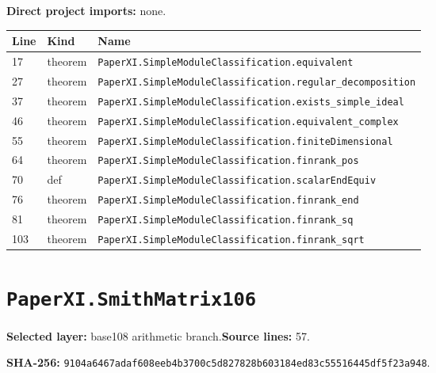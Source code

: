 \documentclass[10pt,oneside]{book}
\begin{document}
\textbf{Direct project imports:} none.

\begin{longtable}{@{}p{}p{}p{}@{}}\toprule Line&Kind&Name\\\midrule\endhead

17&theorem&\nolinkurl{PaperXI.SimpleModuleClassification.equivalent}\\

27&theorem&\nolinkurl{PaperXI.SimpleModuleClassification.regular_decomposition}\\

37&theorem&\nolinkurl{PaperXI.SimpleModuleClassification.exists_simple_ideal}\\

46&theorem&\nolinkurl{PaperXI.SimpleModuleClassification.equivalent_complex}\\

55&theorem&\nolinkurl{PaperXI.SimpleModuleClassification.finiteDimensional}\\

64&theorem&\nolinkurl{PaperXI.SimpleModuleClassification.finrank_pos}\\

70&def&\nolinkurl{PaperXI.SimpleModuleClassification.scalarEndEquiv}\\

76&theorem&\nolinkurl{PaperXI.SimpleModuleClassification.finrank_end}\\

81&theorem&\nolinkurl{PaperXI.SimpleModuleClassification.finrank_sq}\\

103&theorem&\nolinkurl{PaperXI.SimpleModuleClassification.finrank_sqrt}\\

\bottomrule\end{longtable}

\section{\texorpdfstring{\nolinkurl{PaperXI.SmithMatrix106}}{PaperXI.SmithMatrix106}}\label{module:PaperXI.SmithMatrix106}

\textbf{Selected layer:} base108 arithmetic branch.\quad\textbf{Source lines:} 57.\par\textbf{SHA-256:} {\scriptsize\nolinkurl{9104a6467adaf608eeb4b3700c5d827828b603184ed83c55516445df5f23a948}}.

\end{document}

